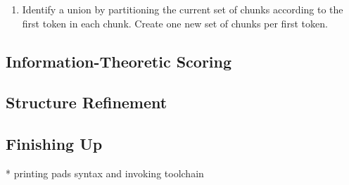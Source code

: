 \begin {enumerate}
\item Identify a union by partitioning the current set of chunks according
to the first token in each chunk.  Create one new set of chunks per first 
token.
\end{enumerate}


\subsection {Information-Theoretic Scoring}



\subsection {Structure Refinement}

%


 

\subsection {Finishing Up}

    * printing pads syntax and invoking toolchain
